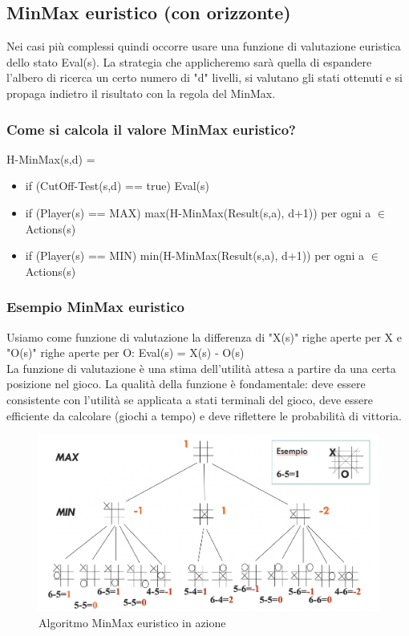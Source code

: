 \documentclass{article}
\begin{document}
\subsection{MinMax euristico (con orizzonte)}
Nei casi più complessi quindi occorre usare una funzione di valutazione euristica dello stato Eval(s). La strategia che applicheremo sarà quella di espandere l'albero di ricerca un certo numero di "d" livelli, si valutano gli stati ottenuti e si propaga indietro il risultato con la regola del MinMax.
\subsubsection{Come si calcola il valore MinMax euristico?}
H-MinMax(s,d) =
\begin{itemize}
    \item if (CutOff-Test(s,d) == true) Eval(s)
    \item if (Player(s) == MAX) max(H-MinMax(Result(s,a), d+1)) per ogni a $\in$ Actions(s)
    \item if (Player(s) == MIN) min(H-MinMax(Result(s,a), d+1)) per ogni a $\in$ Actions(s)
\end{itemize}
\subsubsection{Esempio MinMax euristico}
Usiamo come funzione di valutazione la differenza di "X(s)" righe aperte per X e "O(s)" righe aperte per O: \quad Eval(s) = X(s) - O(s) \\ La funzione di valutazione è una stima dell'utilità attesa a partire da una certa posizione nel gioco. La qualità della funzione è fondamentale: deve essere consistente con l'utilità se applicata a stati terminali del gioco, deve essere efficiente da calcolare (giochi a tempo) e deve riflettere le probabilità di vittoria.
\begin{figure}[h!]
\centering
\includegraphics[scale=0.4]{Images/minmaxeuristico.png}
\caption{Algoritmo MinMax euristico in azione}
\end{figure}
\end{document}
